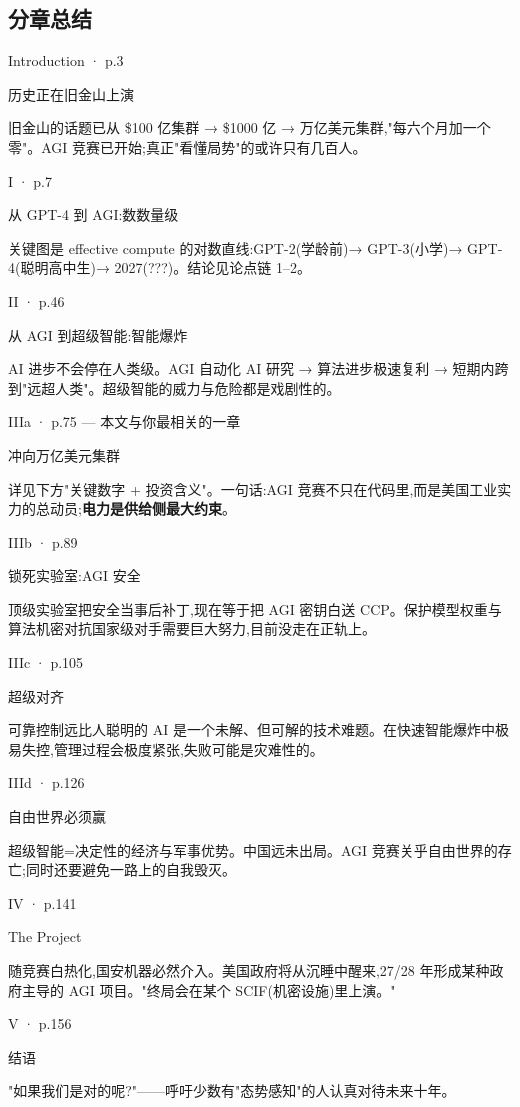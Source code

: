 \subsection{分章总结}\label{ux5206ux7ae0ux603bux7ed3}

Introduction · p.3

历史正在旧金山上演

旧金山的话题已从 \$100 亿集群 → \$1000 亿 → 万亿美元集群,"每六个月加一个零"。AGI 竞赛已开始;真正"看懂局势"的或许只有几百人。

I · p.7

从 GPT-4 到 AGI:数数量级

关键图是 effective compute 的对数直线:GPT-2(学龄前)→ GPT-3(小学)→ GPT-4(聪明高中生)→ 2027(???)。结论见论点链 1--2。

II · p.46

从 AGI 到超级智能:智能爆炸

AI 进步不会停在人类级。AGI 自动化 AI 研究 → 算法进步极速复利 → 短期内跨到"远超人类"。超级智能的威力与危险都是戏剧性的。

IIIa · p.75 --- 本文与你最相关的一章

冲向万亿美元集群

详见下方"关键数字 + 投资含义"。一句话:AGI 竞赛不只在代码里,而是美国工业实力的总动员;\textbf{电力是供给侧最大约束}。

IIIb · p.89

锁死实验室:AGI 安全

顶级实验室把安全当事后补丁,现在等于把 AGI 密钥白送 CCP。保护模型权重与算法机密对抗国家级对手需要巨大努力,目前没走在正轨上。

IIIc · p.105

超级对齐

可靠控制远比人聪明的 AI 是一个未解、但可解的技术难题。在快速智能爆炸中极易失控,管理过程会极度紧张,失败可能是灾难性的。

IIId · p.126

自由世界必须赢

超级智能=决定性的经济与军事优势。中国远未出局。AGI 竞赛关乎自由世界的存亡;同时还要避免一路上的自我毁灭。

IV · p.141

The Project

随竞赛白热化,国安机器必然介入。美国政府将从沉睡中醒来,27/28 年形成某种政府主导的 AGI 项目。"终局会在某个 SCIF(机密设施)里上演。"

V · p.156

结语

"如果我们是对的呢?"------呼吁少数有"态势感知"的人认真对待未来十年。

